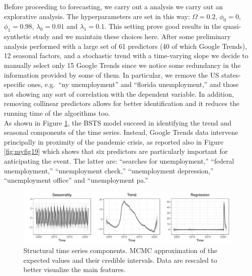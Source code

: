 \documentclass[
  12pt,
]{book}
\theoremstyle{break}
\theoremstyle{nonumberplain}
\begin{document}
Before proceeding to forecasting, we carry out a analysis we carry out
an explorative analysis. The hyperparameters are set in this way:
\(\Omega=0.2\), \(\phi_0=0\), \(\phi_1=0.98\), \(\lambda_0=0.01\) and
\(\lambda_1=0.1\). This setting prove good results in the
quasi-synthetic study and we maintain these choices here. After some
preliminary analysis performed with a large set of 61 predictors (40 of
which Google Trends), 12 seasonal factors, and a stochastic trend with a
time-varying slope we decide to manually select only 15 Google Trends
since we notice some redundancy in the information provided by some of
them. In particular, we remove the US states-specific ones, e.g.~``ny
unemployment'' and ``florida unemployment,'' and those not showing any
sort of correlation with the dependent variable. In addition, removing
collinear predictors allows for better identification and it reduces the
running time of the algorithms too.\\
As shown in Figure \ref{fig:myfig18}, the BSTS model succeed in
identifying the trend and seasonal components of the time series.
Instead, Google Trends data intervene principally in proximity of the
pandemic crisis, as reported also in Figure \ref{fig:myfig19} which
shows that six predictors are particularly important for anticipating
the event. The latter are: ``searches for unemployment,'' ``federal
unemployment,'' ``unemployment check,'' ``unemployment depression,''
``unemployment office'' and ``unemployment pa.''

\begin{figure}[H]

{\centering \includegraphics{Dynamic-Shrinkage-in-Bayesian-Structural-Time-Series-and-Vector-Autoregressive-Models_files/figure-latex/myfig18-1} 

}

\caption{Structural time series components. MCMC approximation of the expected values and their credible intervals. Data are rescaled to better visualize the main features.}\label{fig:myfig18}
\end{figure}
\end{document}
